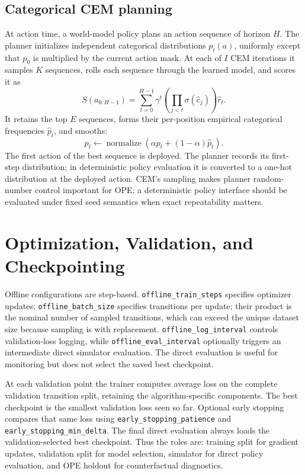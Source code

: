 \documentclass[10pt,twocolumn]{article}
\newcommand{\code}[1]{\texttt{#1}}
\begin{document}
\subsection{Categorical CEM planning}
\label{sec:cem}

At action time, a world-model policy plans an action sequence of horizon $H$. The planner initializes independent categorical distributions $p_t(a)$, uniformly except that $p_0$ is multiplied by the current action mask. At each of $I$ CEM iterations it samples $K$ sequences, rolls each sequence through the learned model, and scores it as
\begin{equation}
 S(a_{0:H-1}) = \sum_{t=0}^{H-1}\gamma^t
 \left(\prod_{j<t}\sigma(\hat c_j)\right)\hat r_t.
\end{equation}
It retains the top $E$ sequences, forms their per-position empirical categorical frequencies $\hat p_t$, and smooths:
\begin{equation}
 p_t \leftarrow \operatorname{normalize}\left(\alpha p_t+(1-\alpha)\hat p_t\right).
\end{equation}
The first action of the best sequence is deployed. The planner records its first-step distribution; in deterministic policy evaluation it is converted to a one-hot distribution at the deployed action. CEM's sampling makes planner random-number control important for OPE: a deterministic policy interface should be evaluated under fixed seed semantics when exact repeatability matters.

\section{Optimization, Validation, and Checkpointing}
\label{sec:training}

Offline configurations are step-based. \code{offline\_train\_steps} specifies optimizer updates; \code{offline\_batch\_size} specifies transitions per update; their product is the nominal number of sampled transitions, which can exceed the unique dataset size because sampling is with replacement. \code{offline\_log\_interval} controls validation-loss logging, while \code{offline\_eval\_interval} optionally triggers an intermediate direct simulator evaluation. The direct evaluation is useful for monitoring but does not select the saved best checkpoint.

At each validation point the trainer computes average loss on the complete validation transition split, retaining the algorithm-specific components. The best checkpoint is the smallest validation loss seen so far. Optional early stopping compares that same loss using \code{early\_stopping\_patience} and \code{early\_stopping\_min\_delta}. The final direct evaluation always loads the validation-selected best checkpoint. Thus the roles are: training split for gradient updates, validation split for model selection, simulator for direct policy evaluation, and OPE holdout for counterfactual diagnostics.
\end{document}
